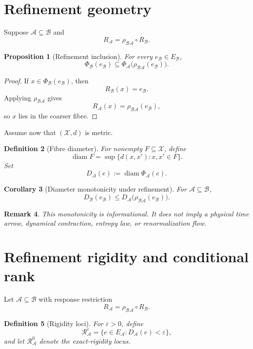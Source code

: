 \documentclass[11pt]{article}
\newtheorem{definition}{Definition}[section]
\newtheorem{proposition}[definition]{Proposition}
\newtheorem{corollary}[definition]{Corollary}
\newtheorem{remark}[definition]{Remark}
\newcommand{\X}{\mathcal X}
\newcommand{\Acal}{\mathcal A}
\newcommand{\Bcal}{\mathcal B}
\begin{document}
\section{Refinement geometry}

Suppose \(\Acal\subseteq\Bcal\) and
\[
R_{\Acal}
=
\rho_{\Bcal\Acal}\circ R_{\Bcal}.
\]

\begin{proposition}[Refinement inclusion]
For every \(e_{\Bcal}\in E_{\Bcal}\),
\[
\Phi_{\Bcal}(e_{\Bcal})
\subseteq
\Phi_{\Acal}\bigl(\rho_{\Bcal\Acal}(e_{\Bcal})\bigr).
\]
\end{proposition}

\begin{proof}
If \(x\in\Phi_{\Bcal}(e_{\Bcal})\), then
\[
R_{\Bcal}(x)=e_{\Bcal}.
\]
Applying \(\rho_{\Bcal\Acal}\) gives
\[
R_{\Acal}(x)=\rho_{\Bcal\Acal}(e_{\Bcal}),
\]
so \(x\) lies in the coarser fibre.
\end{proof}

Assume now that \((\X,d)\) is metric.

\begin{definition}[Fibre diameter]
For nonempty \(F\subseteq\X\), define
\[
\operatorname{diam}F
=
\sup\{d(x,x'):x,x'\in F\}.
\]
Set
\[
D_{\Acal}(e)
:=
\operatorname{diam}\Phi_{\Acal}(e).
\]
\end{definition}

\begin{corollary}[Diameter monotonicity under refinement]
For \(\Acal\subseteq\Bcal\),
\[
D_{\Bcal}(e_{\Bcal})
\le
D_{\Acal}\bigl(\rho_{\Bcal\Acal}(e_{\Bcal})\bigr).
\]
\end{corollary}

\begin{remark}
This monotonicity is informational. It does not imply a physical time arrow,
dynamical contraction, entropy law, or renormalization flow.
\end{remark}

\section{Refinement rigidity and conditional rank}

Let \(\Acal\subseteq\Bcal\) with response restriction
\[
R_{\Acal}=\rho_{\Bcal\Acal}\circ R_{\Bcal}.
\]

\begin{definition}[Rigidity loci]
For \(\varepsilon>0\), define
\[
\mathcal R_{\Acal}^{\varepsilon}
=
\{e\in E_{\Acal}:D_{\Acal}(e)<\varepsilon\},
\]
and let \(\mathcal R_{\Acal}^{0}\) denote the exact-rigidity locus.
\end{definition}
\end{document}
